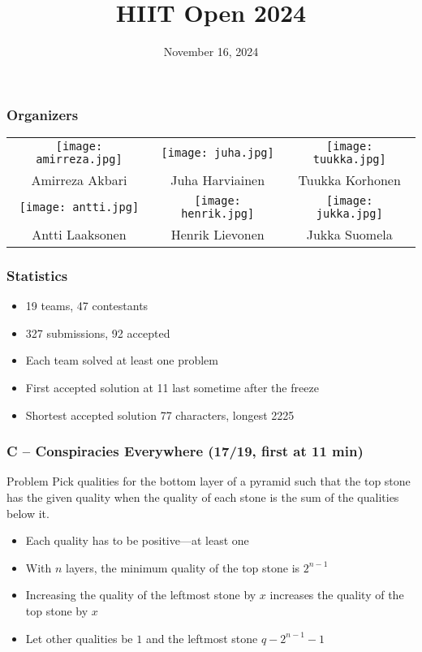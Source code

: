 \documentclass{beamer}
\title{HIIT Open 2024}
\author{}
\institute{}
\date{November 16, 2024}
\begin{document}
\frame{\titlepage}

\begin{frame}
\frametitle{Organizers}
\centering
\begin{tabular}{ccc}
     \texttt{[image: amirreza.jpg]} &
     \texttt{[image: juha.jpg]} &
     \texttt{[image: tuukka.jpg]} \\
     Amirreza Akbari & Juha Harviainen & Tuukka Korhonen \\
     \texttt{[image: antti.jpg]} &
     \texttt{[image: henrik.jpg]} &
     \texttt{[image: jukka.jpg]} \\
     Antti Laaksonen & Henrik Lievonen & Jukka Suomela
\end{tabular}
\end{frame}

\begin{frame}
\frametitle{Statistics}
\begin{itemize}
    \item 19 teams, 47 contestants
    \item 327 submissions, 92 accepted
    \item Each team solved at least one problem
    \item First accepted solution at 11 last sometime after the freeze
    \item Shortest accepted solution 77 characters, longest 2225
\end{itemize}
\end{frame}

\begin{frame}
\frametitle{C -- Conspiracies Everywhere (17/19, first at 11 min)}

    \begin{block}{Problem}
    Pick qualities for the bottom layer of a pyramid such that the top stone has the given quality when the quality of each stone is the sum of the qualities below it. 
    \end{block}
    \begin{itemize}
        \item Each quality has to be positive---at least one
        \item With $n$ layers, the minimum quality of the top stone is $2^{n - 1}$
        \item Increasing the quality of the leftmost stone by $x$ increases the quality of the top stone by $x$
        \item Let other qualities be $1$ and the leftmost stone $q - 2^{n - 1} - 1$
    \end{itemize}
\end{frame}
\end{document}
